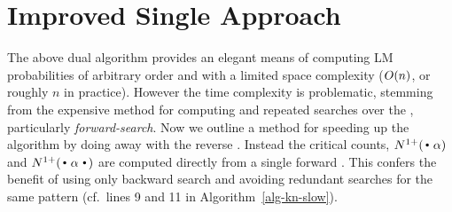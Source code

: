 \section{Improved Single \CST Approach}
\label{sec-single-cst}

The above dual \CST algorithm provides an elegant means of computing LM probabilities of arbitrary order and with a limited space complexity ($O(n)$, or roughly $n$ in practice).
However the time complexity is problematic, stemming from the expensive method for computing \nlplusfrontbackname and repeated searches over the \CST, particularly \emph{forward-search}.
Now we outline a method for speeding up the algorithm by doing away with the reverse \CST.
Instead the critical counts, $\nlplus{\dotpat}$ and $\nlplus{\dotpatdot}$ are computed directly from a single forward \CST. 
This confers the benefit of using only backward search and avoiding redundant searches for the same pattern (cf.~lines 9 and 11 in Algorithm~\ref{alg-kn-slow}).


